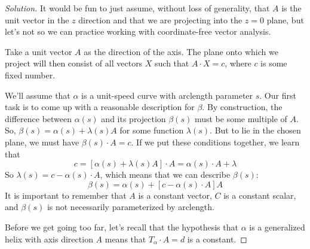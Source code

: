 \documentclass[Shifrin_Solutions_Spring_2018]{subfiles}
\begin{document}
\begin{proof}[Solution]
It would be fun to just assume, without loss of generality, that $A$ is the unit vector
in the $z$ direction and that we are projecting into the $z=0$ plane, but let's not so 
we can practice working with coordinate-free vector analysis.

Take a unit vector $A$ as the direction of the axis. The plane onto which we project 
will then consist of all vectors $X$ such that $A\cdot X = c$, where $c$ is some 
fixed number. 

We'll assume that $\alpha$ is a unit-speed curve with arclength parameter $s$. Our 
first task is to come up with a reasonable description for $\beta$. By construction,
the difference between $\alpha(s)$ and its projection $\beta(s)$ must be some 
multiple of $A$. So, $\beta(s) = \alpha(s) + \lambda(s) A$ for some function 
$\lambda(s)$. But to lie in the chosen plane, we must have $\beta(s) \cdot A = c$. 
If we put these conditions together, we learn that
\[
c = \left[ \alpha(s) + \lambda(s)A\right ]\cdot A = \alpha(s)\cdot A + \lambda
\]
So $\lambda(s) = c - \alpha(s)\cdot A$, which means that we can describe $\beta(s)$:
\[
\beta(s) = \alpha(s) + \left[ c - \alpha(s)\cdot A\right] A
\]
It is important to remember that $A$ is a constant vector, $C$ is a constant scalar,
and $\beta(s)$ is not necessarily parameterized by arclength.

Before we get going too far, let's recall that the hypothesis that $\alpha$ is a
generalized helix with axis direction $A$ means that $T_{\alpha} \cdot A = d$ is
a constant.


\end{proof}
\end{document}
